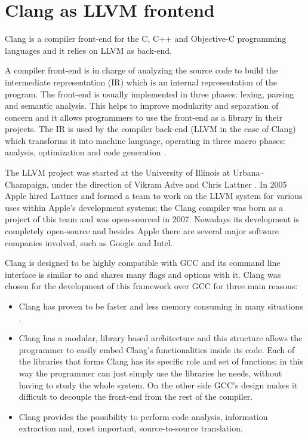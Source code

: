 \documentclass[a4paper,12pt,oneside]{book}
\begin{document}
\section{Clang as LLVM frontend}

Clang \cite{clang} is a compiler front-end for the C, C++ and Objective-C programming languages and it relies on LLVM as back-end. 

A compiler front-end is in charge of analyzing the source code to build the intermediate representation (IR) which is an internal representation of the program. The front-end is usually implemented in three phases: lexing, parsing and semantic analysis. This helps to improve modularity and separation of concern and it allows programmers to use the front-end as a library in their projects.  The IR is used by the compiler back-end (LLVM in the case of Clang) which transforms it into machine language, operating in three macro phases: analysis, optimization and code generation \cite{compiler}. 

The LLVM project was started at the University of Illinois at Urbana–Champaign, under the direction of Vikram Adve and Chris Lattner \cite{llvm1} \cite{llvm2}. In 2005 Apple hired Lattner and formed a team to work on the LLVM system for various uses within Apple's development systems; the Clang compiler was born as a project of this team and was open-sourced in 2007. Nowadays its development is completely open-source and besides Apple there are several major software companies involved, such as Google and Intel.

Clang is designed to be highly compatible with GCC and its command line interface is similar to and shares many flags and options with it. Clang was chosen for the development of this framework over GCC for three main reasons:
\begin{itemize}
 \item Clang has proven to be faster and less memory consuming in many situations \cite{clanggcc}. 
 \item Clang has a modular, library based architecture and this structure allows the programmer to easily embed Clang’s functionalities inside its code. Each of the libraries that forms Clang has its specific role and set of functions; in this way the programmer can just simply use the libraries he needs, without having to study the whole system. On the other side GCC's design makes it difficult to decouple the front-end from the rest of the compiler.
 \item Clang provides the possibility to perform code analysis, information extraction and, most important, source-to-source translation.
\end{itemize}
\end{document}
